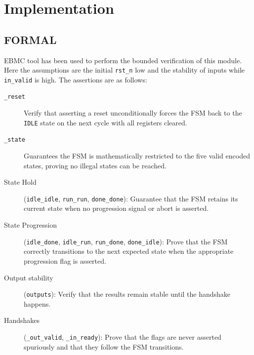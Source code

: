 \chapter{Implementation} 
\label{cha:implementation}

\section{FORMAL}
EBMC tool has been used to perform the bounded verification of this module.
Here the assumptions are the initial \texttt{rst\_n} low and the stability of inputs while \texttt{in\_valid} is high.
The assertions are as follows:
\begin{description}
    \item[\texttt{\_reset}]
        Verify that asserting a reset unconditionally forces the FSM back to the \texttt{IDLE} state on the next cycle with all registers cleared.
        
    \item[\texttt{\_state}]
        Guarantees the FSM is mathematically restricted to the five valid encoded states, proving no illegal states can be reached.
        
    \item[State Hold] (\texttt{idle\_idle}, \texttt{run\_run}, \texttt{done\_done}):
        Guarantee that the FSM retains its current state when no progression signal or abort is asserted.
        
    \item[State Progression] (\texttt{idle\_done}, \texttt{idle\_run}, \texttt{run\_done}, \texttt{done\_idle}):
        Prove that the FSM correctly transitions to the next expected state when the appropriate progression flag is asserted.
        
    \item[Output stability] (\texttt{outputs}):
        Verify that the results remain stable until the handshake happens.
        
    \item[Handshakes] (\texttt{\_out\_valid}, \texttt{\_in\_ready}):
        Prove that the flags are never asserted spuriously and that they follow the FSM transitions.
        
\end{description}

